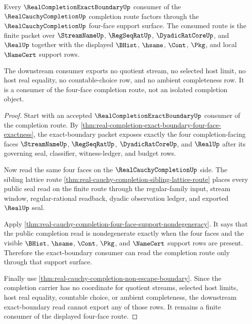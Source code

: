 \begin{theorem}
\label{thm:real-cauchy-completion-exact-boundary-downstream-route}
Every $\RealCompletionExactBoundaryUp$ consumer of the $\RealCauchyCompletionUp$ completion route factors through the $\RealCauchyCompletionUp$ four-face support surface. The consumed route is the finite packet over $\StreamNameUp$, $\RegSeqRatUp$, $\DyadicRatCoreUp$, and $\RealUp$ together with the displayed $\BHist$, $\hsame$, $\Cont$, $\Pkg$, and local $\NameCert$ support rows.

The downstream consumer exports no quotient stream, no selected host limit, no host real equality, no countable-choice row, and no ambient completeness row. It is a consumer of the four-face completion route, not an isolated completion object.
\end{theorem}
\begin{proof}
Start with an accepted $\RealCompletionExactBoundaryUp$ consumer of the completion route. By \autoref{thm:real-completion-exact-boundary-four-face-exactness}, the exact-boundary packet exposes exactly the four completion-facing faces $\StreamNameUp$, $\RegSeqRatUp$, $\DyadicRatCoreUp$, and $\RealUp$ after its governing seal, classifier, witness-ledger, and budget rows.

Now read the same four faces on the $\RealCauchyCompletionUp$ side. The sibling lattice route \autoref{thm:real-cauchy-completion-sibling-lattice-route} places every public seal read on the finite route through the regular-family input, stream window, regular-rational readback, dyadic observation ledger, and exported $\RealUp$ seal.

Apply \autoref{thm:real-cauchy-completion-four-face-support-nondegeneracy}. It says that the public completion read is nondegenerate exactly when the four faces and the visible $\BHist$, $\hsame$, $\Cont$, $\Pkg$, and $\NameCert$ support rows are present. Therefore the exact-boundary consumer can read the completion route only through that support surface.

Finally use \autoref{thm:real-cauchy-completion-non-escape-boundary}. Since the completion carrier has no coordinate for quotient streams, selected host limits, host real equality, countable choice, or ambient completeness, the downstream exact-boundary read cannot export any of those rows. It remains a finite consumer of the displayed four-face route.
\end{proof}

